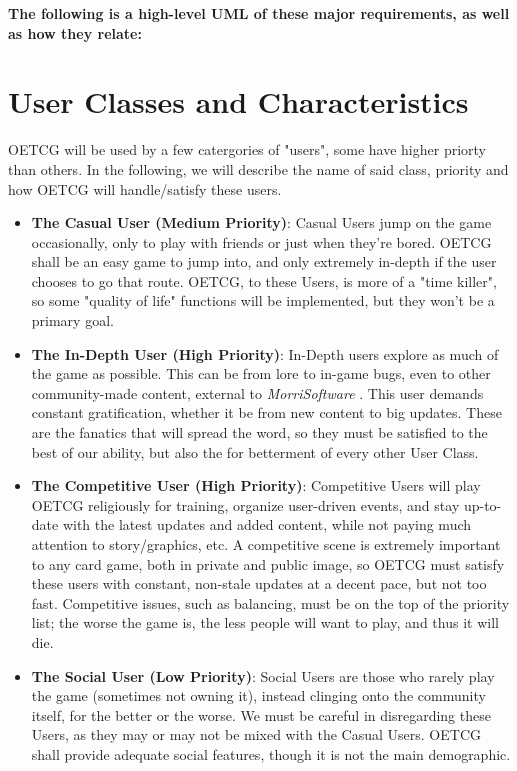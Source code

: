 \documentclass{scrreprt}
\def\orgname{\textit{MorriSoftware} }
\begin{document}
\textbf{The following is a high-level UML of these major requirements, as well as how they relate:}


\section{User Classes and Characteristics}
OETCG will be used by a few catergories of "users", some have higher priorty than others.
In the following, we will describe the name of said class, priority and how OETCG will handle/satisfy these users.

\begin{itemize}
	\item \textbf{The Casual User (Medium Priority)}: Casual Users jump on the game occasionally, only to play with friends or just when they're bored. OETCG shall be an easy game to jump into, and only extremely in-depth if the user chooses to go that route. OETCG, to these Users, is more of a "time killer", so some "quality of life" functions will be implemented, but they won't be a primary goal.
	\item \textbf{The In-Depth User (High Priority)}: In-Depth users explore as much of the game as possible. This can be from lore to in-game bugs, even to other community-made content, external to \orgname. This user demands constant gratification, whether it be from new content to big updates. These are the fanatics that will spread the word, so they must be satisfied to the best of our ability, but also the for betterment of every other User Class.
	\item \textbf{The Competitive User (High Priority)}: Competitive Users will play OETCG religiously for training, organize user-driven events, and stay up-to-date with the latest updates and added content, while not paying much attention to story/graphics, etc. A competitive scene is extremely important to any card game, both in private and public image, so OETCG must satisfy these users with constant, non-stale updates at a decent pace, but not too fast. Competitive issues, such as balancing, must be on the top of the priority list; the worse the game is, the less people will want to play, and thus it will die.
	\item \textbf{The Social User (Low Priority)}: Social Users are those who rarely play the game (sometimes not owning it), instead clinging onto the community itself, for the better or the worse. We must be careful in disregarding these Users, as they may or may not be mixed with the Casual Users. OETCG shall provide adequate social features, though it is not the main demographic.

\end{itemize}
\end{document}
